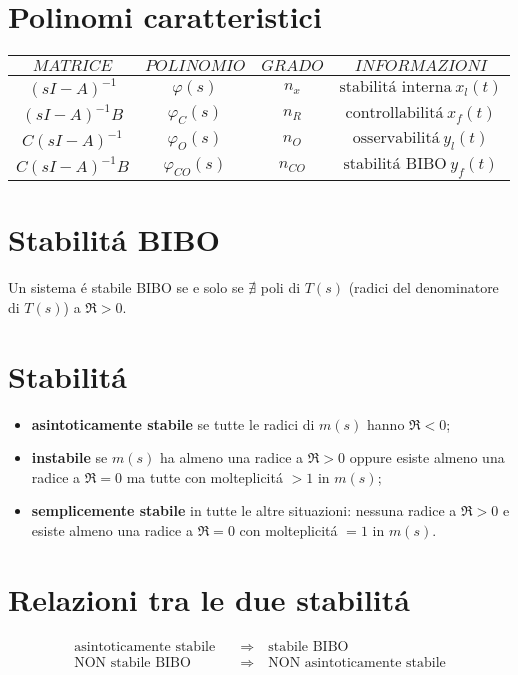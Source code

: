 \documentclass[../main.tex]{subfiles}
\begin{document}
	\section{Polinomi caratteristici}
		\bgroup
		\def\arraystretch{0.2} %
		\begin{tabular}{|>{\centering\arraybackslash}m{1.5in}|>{\centering\arraybackslash}m{1in}|>{\centering\arraybackslash}m{1in}|>{\centering\arraybackslash}m{1.5in}|}
			\hline
			$$ MATRICE $$ & $$ POLINOMIO $$ & $$ GRADO $$ & $$ INFORMAZIONI $$\\
			\hline
			$$ (sI-A)^{-1} $$ & $$ \varphi(s) $$ & $$ n_x $$ & $$ \text{stabilit\'a interna}\ x_l(t) $$ \\
			\hline
			$$ (sI-A)^{-1}B $$ & $$ \varphi_C(s) $$ & $$ n_R $$ & $$ \text{controllabilit\'a}\ x_f(t) $$ \\
			\hline
			$$ C(sI-A)^{-1} $$ & $$ \varphi_O(s) $$ & $$ n_O $$ & $$ \text{osservabilit\'a}\ y_l(t) $$ \\
			\hline
			$$ C(sI-A)^{-1}B $$ & $$ \varphi_{CO}(s) $$ & $$ n_{CO} $$ & $$ \text{stabilit\'a BIBO}\ y_f(t) $$ \\
			\hline
		\end{tabular}
		\egroup
		
	\section{Stabilit\'a BIBO}
		Un sistema \'{e} stabile BIBO se e solo se $ \nexists $ poli di $ T(s) $ (radici del denominatore di $ T(s) $) a $ \Re > 0 $.
		
	\section{Stabilit\'a}
		\begin{itemize}
			\item
				\textbf{asintoticamente stabile} se tutte le radici di $ m(s) $ hanno $ \Re < 0 $;
			\item
				\textbf{instabile} se $ m(s) $ ha almeno una radice a $ \Re > 0 $ oppure esiste almeno una radice a $ \Re = 0 $ ma tutte con molteplicit\'a $ >1 $ in $ m(s) $;
			\item
				\textbf{semplicemente stabile} in tutte le altre situazioni: nessuna radice a $ \Re > 0 $ e esiste almeno una radice a $ \Re = 0 $ con molteplicit\'a $ =1 $ in $ m(s) $.
		\end{itemize}
	
	\section{Relazioni tra le due stabilit\'a}
		\[
			\begin{aligned}
				\text{asintoticamente stabile} &\quad\Rightarrow\quad \text{stabile BIBO}
				\\
				\text{NON stabile BIBO} &\quad\Rightarrow\quad \text{NON asintoticamente stabile}
			\end{aligned}
		\]
\end{document}
